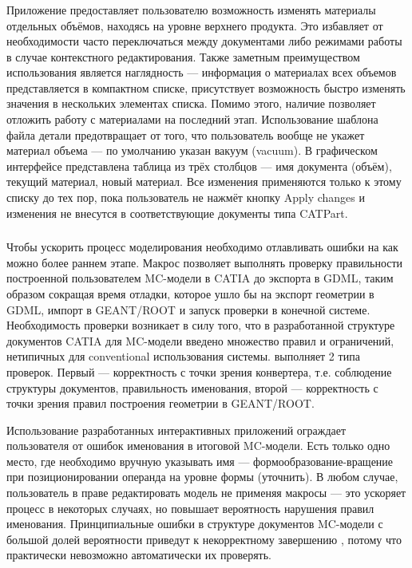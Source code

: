 \subsubsection{}\label{sec:MaterialsManager}

Приложение  предоставляет пользователю возможность изменять материалы отдельных объёмов, находясь на уровне верхнего продукта. Это избавляет от необходимости часто переключаться между документами либо режимами работы в случае контекстного редактирования. Также заметным преимуществом использования  является наглядность --- информация о материалах всех объемов представляется в компактном списке, присутствует возможность быстро изменять значения в нескольких элементах списка. Помимо этого, наличие  позволяет отложить работу с материалами на последний этап. Использование шаблона файла детали предотвращает от того, что пользователь вообще не укажет материал объема --- по умолчанию указан вакуум (vacuum). В графическом интерфейсе  представлена таблица из трёх столбцов --- имя документа (объём), текущий материал, новый материал. Все изменения применяются только к этому списку до тех пор, пока пользователь не нажмёт кнопку Apply changes \todo и изменения не внесутся в соответствующие документы типа CATPart.

\subsubsection{}\label{sec:Checker}

Чтобы ускорить процесс моделирования необходимо отлавливать ошибки на как можно более раннем этапе. Макрос  позволяет выполнять проверку правильности построенной пользователем MC-модели в CATIA до экспорта в GDML, таким образом сокращая время отладки, которое ушло бы на экспорт геометрии в GDML, импорт в GEANT/ROOT и запуск проверки в конечной системе. Необходимость проверки возникает в силу того, что в разработанной структуре документов CATIA для MC-модели введено множество правил и ограничений, нетипичных для \todo conventional использования системы.  выполняет 2 типа проверок. Первый --- корректность с точки зрения конвертера, т.е. соблюдение структуры документов, правильность именования, второй --- корректность с точки зрения правил построения геометрии в GEANT/ROOT.

Использование разработанных интерактивных приложений ограждает пользователя от ошибок именования в итоговой MC-модели. Есть только одно место, где необходимо вручную указывать имя --- формообразование-вращение при позиционировании операнда на уровне формы (\todo уточнить). В любом случае, пользователь в праве редактировать модель не применяя макросы --- это ускоряет процесс в некоторых случаях, но повышает вероятность нарушения правил именования. Принципиальные ошибки в структуре документов MC-модели с большой долей вероятности приведут к некорректному завершению , потому что практически невозможно автоматически их проверять.

